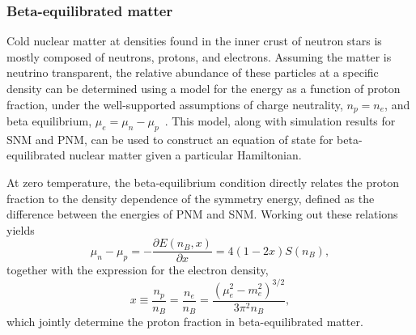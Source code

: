 

\subsubsection{Beta-equilibrated matter}

Cold nuclear matter at densities found in the inner crust of neutron stars is mostly composed of neutrons, protons, and electrons. Assuming the matter is neutrino transparent, the relative abundance of these particles at a specific density can be determined using a model for the energy as a function of proton fraction, under the well-supported assumptions of charge neutrality, $n_p = n_e$, and beta equilibrium, $\mu_e=\mu_n-\mu_p$~\cite{benhar2023}. This model, along with simulation results for SNM and PNM, can be used to construct an equation of state for beta-equilibrated nuclear matter given a particular Hamiltonian. 

At zero temperature, the beta-equilibrium condition directly relates the proton fraction to the density dependence of the symmetry energy, defined as the difference between the energies of PNM and SNM. Working out these relations yields
\begin{equation}
\mu_n - \mu_p = -\frac{\partial E(n_B,x)}{\partial x} = 4(1-2x) S(n_B),
\label{eq:mu_hat}
\end{equation}
together with the expression for the electron density,
\begin{equation}
x \equiv \frac{n_p}{n_B} = \frac{n_e}{n_B} = \frac{(\mu_e^2 - m_e^2)^{3/2}}{3\pi^2 n_B},
\label{eq:x_from_ne}
\end{equation}
which jointly determine the proton fraction in beta-equilibrated matter.

